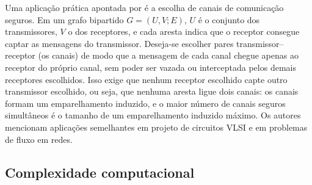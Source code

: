 \begin{figure}[H]
\end{figure}

Uma aplicação prática apontada por  é a escolha de canais de comunicação seguros. Em um grafo bipartido $G = (U, V; E)$, $U$ é o conjunto dos transmissores, $V$ o dos receptores, e cada aresta indica que o receptor consegue captar as mensagens do transmissor. Deseja-se escolher pares transmissor--receptor (os canais) de modo que a mensagem de cada canal chegue apenas ao receptor do próprio canal, sem poder ser vazada ou interceptada pelos demais receptores escolhidos. Isso exige que nenhum receptor escolhido capte outro transmissor escolhido, ou seja, que nenhuma aresta ligue dois canais: os canais formam um emparelhamento induzido, e o maior número de canais seguros simultâneos é o tamanho de um emparelhamento induzido máximo. Os autores mencionam aplicações semelhantes em projeto de circuitos VLSI e em problemas de fluxo em redes.

\subsection{Complexidade computacional}

